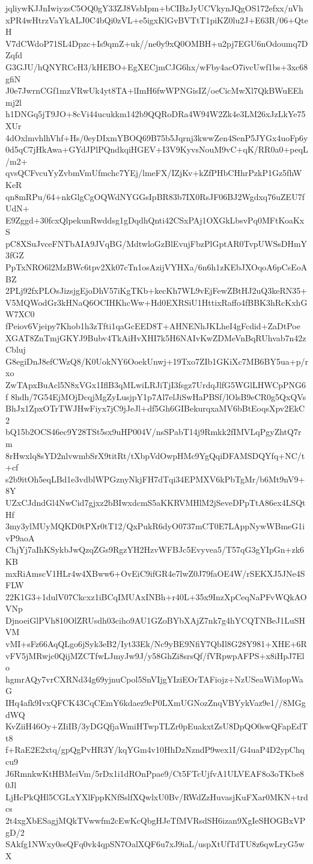 jqliywKJJnIwiyzsC5OQ0gY33ZJ8VsbIpm+bCIBzJyUCVkynJQgOS172efxx/nVh
xPR4wHtrzVaYkALJ0C4bQi0zVL+e5igxKlGvBVTtT1piKZ0lu2J+E63R/06+QteH
V7dCWdoP71SL4Dpzc+Is9qmZ+uk//ne0y9xQ0OMBH+u2pj7EGU6nOdoumq7DZqfd
G3GJU/hQNYRCcH3/kHEBO+EgXECjmCJG6hx/wFby4acO7ivcUwf1bs+3xc68gfiN
J0e7JwrnCGf1mzVRwUk4yt8TA+lImH6fwWPNGisIZ/oeCicMwXl7QkBWuEEhmj2l
h1DNGq5jT9JO+8cVi44ucukkm142b9QQRoDRa4W94W2Zk4e3LM26xJzLkYe75XUr
4dOxlmvhlhVhf+Hs/0eyDIxmYBOQ69B75b5Jqrnj3kwwZen4SenP5JYGx4uoFp6y
0d5qC7jHkAwa+GYdJPlPQndkqiHGEV+I3V9KyvsNouM9vC+qK/RR0a0+peqL/m2+
qvsQCFvcuYyZvbmVmUfmchc7YEj/lmeFX/IZjKv+kZfPHbCHhrPzkP1Gz5fhWKeR
qn8mRPu/64+nkGlgCgOQWdNYGGsIpBR83b7IX0RsJF06BJ2Wgdxq76uZEU7fUdN+
E9Zggd+30fcxQlpekunRwddsg1gDqdhQnti42CSxPAj1OXGkLbsvPq0MFtKoaKxS
pC8XSuJvceFNTbAIA9JVqBG/MdtwloGzBlEvujFbzPlGptAR0TvpUWSsDHmY3fGZ
PpTxNRO6l2MzBWc6tpv2Xk07cTn1osAzijVYHXa/6n6h1zKEbJXOqoA6pCsEoABZ
2PLj92fxPLOsJizsjgEjoDhV57iKgTKb+kecKh7WL9vEjFewZBtHJ2uQ3keRN35+
V5MQWodGr3kHNaQ6OCIHKhcWw+Hd0EXRSiU1HttixRaffo4fBBK3hRcKxhGW7XC0
fPeiov6Vjeipy7Khob1h3zTfti1qaGcEED8T+AHNENhJKLheI4gFcdid+ZaDtPoe
XGAT8ZnTmjGKYJ9Bubv4TkAiHvXHI7k5H6NAIvKwZDMeVnBqRUhvab7n42zCbluj
G8egiDnJ8efCWzQ8/K0UokNY6OoekUnwj+19Txo7ZIb1GKiXc7MB6BY5ua+p/rxo
ZwTApxBuAcl5N8xVGx1IflB3qMLwiLRJiTjI3fsgz7UrdqJlfG5WGlLHWCpPNG6f
8hdh/7G54EjMOjDcqjMgZyLusjpY1p7Al7elJiSwHaPBSf/lOlsB9eCR0g5QxQVs
BhJx1ZpxOTrTWJHwFiyx7jC9jJeJl+df5Gh6GIBekurqxaMV6bBtEoqsXpv2EkC2
bQ15b2OCS46ec9Y28TSt5sx9uHP004V/nsSPabT14j9Rmkk2fIMVLqPgyZhtQ7rm
8rHwxlq8sYD2nlvwmbSrX9titRt/tXbpVdOwpHMc9YgQqiDFAMSDQYfq+NC/t+cf
s2b9itOh5eqLBd1e3vdblWPGznyNkjFH7dTqi34EPMXV6kPbTgMr/b6Mt9nV9+8Y
UZxCJdndGl4NwCid7gjxz2bBIwxdcmS5aKKRVMHlM2jSeveDPpTtA86ex4LSQtHf
3my3ylMUyMQKD0tPXr0tT12/QxPukR6dyO0737mCT0E7LAppNywWBmeG1ivP9aoA
ChjYj7aIhKSykbJwQzqZGs9RgzYH2HzvWFBJc5Evyvea5/T57qG3gYIpGn+zk6KB
mxRiAmscV1HLr4w4XBww6+OvEiC9ifGR4e7lwZ0J79faOE4W/rSEKXJ5JNe4SFLW
22K1G3+1dulV07Ckcxz1iBCqIMUAxINBh+r40L+35x9InzXpCeqNaPFvWQkAOVNp
DjnoeiGlPVh810OlZRUsdh03ciho9AU1GZoBYbXAjZ7nk7g4hYCQTNBeJ1LuSHVM
vMI+sFz66AqQLgo6jSyk3eB2/Iyt33Ek/Nc9yBE9NfiY7QbIl8G28Y981+XHE+6R
vFV5jMRwjc0QijMZCTfwLJmyJw9J/y58GhZi8srsQf/fVRpwpAFPS+x8iHpJ7Elo
hgmrAQy7vrCXRNd34g69yjnuCpol5SnVIjgYIziEOrTAFiojz+NzUSeaWiMopWaG
IHq4afk9IvxQFCK43CqCEmY6kdaez9cP0LXmUGNozZnqVBYykVaz9e1//8MGgdWQ
KvZiiH46Oy+ZIiIB/3yDGQfjaWmiHTwpTLZr0pEuakxtZsU8DpQO0swQFapEdTt8
f+RaE2E2xtq/gpQgPvHR3Y/kqYGm4v10HhDzNzndP9wex1I/G4uaP4D2ypChqcu9
J6RmnkwKtHBMeiVm/5rDx1i1dROnPpae9/Ct5FTcUjfvA1ULVEAF8o3oTKbe80Jl
LjHcPkQHl5CGLxYXlFppKNfSslfXQwlxU0Bv/RWdZzHuvasjKuFXar0MKN+trdcs
2t4xgXbESagjMQkTVwwfm2cEwKcQbgHJeTfMVRsdSH6izan9XgIeSHOGBxVPgD/2
SAkfg1NWxy0seQFq0vk4qpSN7OalXQF6u7xJ9iaL/uspXtUfTdTU8z6qwLryG5wX
